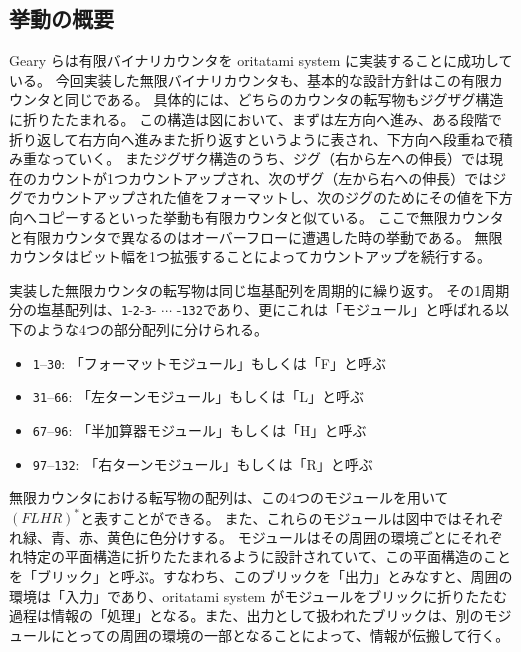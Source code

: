 \documentclass[a4j,11pt]{article}
\begin{document}
\subsection{挙動の概要}
Geary らは有限バイナリカウンタを oritatami system に実装することに成功している\cite{GeMeScSe2019}。
今回実装した無限バイナリカウンタも、基本的な設計方針はこの有限カウンタと同じである。
具体的には、どちらのカウンタの転写物もジグザグ構造に折りたたまれる。
この構造は図において、まずは左方向へ進み、ある段階で折り返して右方向へ進みまた折り返すというように表され、下方向へ段重ねで積み重なっていく。
またジグザク構造のうち、ジグ（右から左への伸長）では現在のカウントが1つカウントアップされ、次のザグ（左から右への伸長）ではジグでカウントアップされた値をフォーマットし、次のジグのためにその値を下方向へコピーするといった挙動も有限カウンタと似ている。
ここで無限カウンタと有限カウンタで異なるのはオーバーフローに遭遇した時の挙動である。
無限カウンタはビット幅を1つ拡張することによってカウントアップを続行する。
%
%


実装した無限カウンタの転写物は同じ塩基配列を周期的に繰り返す。
その1周期分の塩基配列は、\texttt{1}-\texttt{2}-\texttt{3}- $\cdots$ -\texttt{132}であり、更にこれは「モジュール」と呼ばれる以下のような4つの部分配列に分けられる。

\begin{itemize}
\item \texttt{1}--\texttt{30}: 「フォーマットモジュール」もしくは「F」と呼ぶ
\item \texttt{31}--\texttt{66}: 「左ターンモジュール」もしくは「L」と呼ぶ
\item \texttt{67}--\texttt{96}: 「半加算器モジュール」もしくは「H」と呼ぶ
\item \texttt{97}--\texttt{132}: 「右ターンモジュール」もしくは「R」と呼ぶ
\end{itemize}

無限カウンタにおける転写物の配列は、この4つのモジュールを用いて$(FLHR)^*$と表すことができる。
また、これらのモジュールは図中ではそれぞれ緑、青、赤、黄色に色分けする。
モジュールはその周囲の環境ごとにそれぞれ特定の平面構造に折りたたまれるように設計されていて、この平面構造のことを「ブリック」と呼ぶ。すなわち、このブリックを「出力」とみなすと、周囲の環境は「入力」であり、oritatami system がモジュールをブリックに折りたたむ過程は情報の「処理」となる。また、出力として扱われたブリックは、別のモジュールにとっての周囲の環境の一部となることによって、情報が伝搬して行く。
\end{document}
